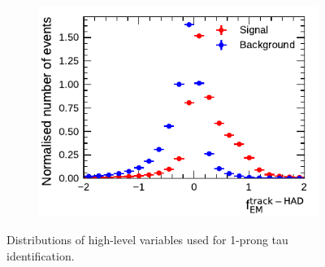 \begin{figure}[htbp]
\begin{subfigure}{0.5\textwidth}
  \end{subfigure}%
  \begin{subfigure}{0.5\textwidth}
    \centering
    \includegraphics{./figures/baseline_bdt_vars/1p/ChPiEMEOverCaloEME.pdf}
  \end{subfigure}
  \caption[Distributions of high-level variables used for 1-prong tau
  identification]{Distributions of high-level variables used for 1-prong tau
    identification.}
  \label{fig:bdt_vars_1p_overlays}
\end{figure}

